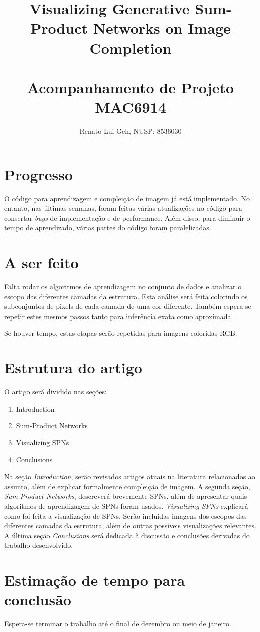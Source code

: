 \documentclass[12pt]{article}
\title{%
  Visualizing Generative Sum-Product Networks on Image Completion\\~\\
  {\normalfont Acompanhamento de Projeto MAC6914}
}
\author{Renato Lui Geh, NUSP: 8536030}
\date{}
\theoremstyle{plain}
\numberwithin{equation}{section}
\begin{document}
\maketitle

\section{Progresso}

O código para aprendizagem e compleição de imagem já está implementado. No entanto, nas últimas
semanas, foram feitas várias atualizações no código para consertar \textit{bugs} de implementação e
de performance. Além disso, para diminuir o tempo de aprendizado, várias partes do código foram
paralelizadas.

\section{A ser feito}

Falta rodar os algoritmos de aprendizagem no conjunto de dados e analizar o escopo das diferentes
camadas da estrutura. Esta análise será feita colorindo os subconjuntos de pixels de cada camada de
uma cor diferente. Também espera-se repetir estes mesmos passos tanto para inferência exata como
aproximada.

Se houver tempo, estas etapas serão repetidas para imagens coloridas RGB.

\section{Estrutura do artigo}

O artigo será dividido nas seções:

\begin{enumerate}
  \item Introduction
  \item Sum-Product Networks
  \item Visualizing SPNs
  \item Conclusions
\end{enumerate}

Na seção \textit{Introduction}, serão revisados artigos atuais na literatura relacionados ao assunto, além
de explicar formalmente compleição de imagem. A segunda seção, \textit{Sum-Product Networks},
descreverá brevemente SPNs, além de apresentar quais algoritmos de aprendizagem de SPNs foram
usados. \textit{Visualizing SPNs} explicará como foi feita a visualização de SPNs. Serão incluídas
imagens dos escopos das diferentes camadas da estrutura, além de outras possíveis visualizações
relevantes. A última seção \textit{Conclusions} será dedicada à discussão e conclusões derivadas do
trabalho desenvolvido.

\section{Estimação de tempo para conclusão}

Espera-se terminar o trabalho até o final de dezembro ou meio de janeiro.

\printbibliography[]
\end{document}
